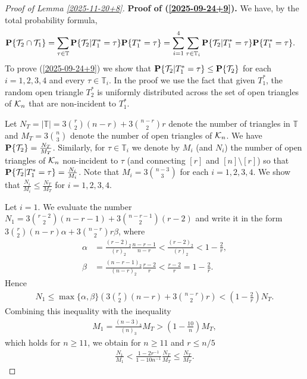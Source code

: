 \documentclass[11pt, a4paper]{article}
\newcommand{\PP}{{\bf{P}}}
\begin{document}
\begin{proof}[Proof of Lemma \ref{2025-11-20+8}]
\smallskip
 
{\bf Proof of (\ref{2025-09-24+9}).}
 We have, by the total probability formula,
 \begin{align*}
 \PP\{{\cal T}_2\cap {\cal T}_1\}
 &
 =
 \sum_{\tau\in{\mathbb T}}
 \PP\{{\cal T}_2|T^*_1=\tau\}
  \PP\{T^*_1=\tau\}
  =
\sum_{i=1}^4
\sum_{\tau\in{\mathbb T}_i}
 \PP\{{\cal T}_2|T^*_1=\tau\}
  \PP\{T^*_1=\tau\}.
 \end{align*}
To prove (\ref{2025-09-24+9}) we show that 
$\PP\{{\cal T}_2|T^*_1=\tau\}
 \le \PP\{{\cal T}_2\}$
 for each $i=1,2,3,4$ and every $\tau\in {\mathbb T}_i$. In the proof we use the fact that given 
$T_1^*$, the random open triangle $T_2^*$ is uniformly distributed 
across the set of open triangles of ${\cal K}_n$ that are 
non-incident to $T_1^*$.
 
 Let  
 $N_T=|{\mathbb T}|=3\binom{r}{2}(n-r)+3\binom{n-r}{2}r$ denote
 the number of triangles 
 in $\mathbb T$ and 
$M_T=3\binom{n}{3}$ denote the number of open triangles of ${\cal K}_n$. 
We have $\PP\{{\cal T}_2\}=\frac{N_T}{M_T}$.
Similarly, for $\tau\in{\mathbb T}_i$ we denote
by 
$M_i$ (and $N_i$) the number of open triangles 
 of ${\cal K}_n$ non-incident to 
$\tau$ (and connecting $[r]$ and $[n]\setminus[r]$) so that
$\PP\{{\cal T}_2|T^*_1=\tau\}
=\frac{N_i}{M_i}$.
Note that 
 $M_i=3\binom{n-3}{3}$ for each $i=1,2,3,4$.
 We show that $\frac{N_i}{M_i}\le \frac{N_T}{M_T}$ for $i=1,2,3,4$.  
  
  

Let $i=1$.
We evaluate the number  
$
N_1
=
3\binom{r-2}{2}(n-r-1)+ 3\binom{n-r-1}{2}(r-2)
$ and write it in the form
$
3\binom{r}{2}(n-r)\alpha+3\binom{n-r}{2}r \beta$,
where
\begin{align*}
\alpha
&
=\frac{(r-2)_2}{(r)_2}\frac{n-r-1}{n-r}
<
\frac{(r-2)_2}{(r)_2}
<
1-\frac{2}{r},
\\
\beta
&
=\frac{(n-r-1)_2}{(n-r)_2}\frac{r-2}{r}
<\frac{r-2}{r}
=
1-\frac{2}{r}.
\end{align*}
Hence
\begin{align*}
N_1
\le 
\max\{\alpha,\beta\}
\left(3\binom{r}{2}(n-r)+3\binom{n-r}{2}r \right)
<
\left(1-\frac{2}{r}\right)
N_T.
\end{align*}
Combining this inequality with the inequality
\begin{align}
\label{2025-09-24+5}
M_1
=
\frac{(n-3)_3}{(n)_3}
M_T
>
\left(1-\frac{10}{n}\right)
M_T,
\end{align}
which holds for  $n\ge 11$, we obtain for 
$n\ge 11$ and $r\le n/5$
\begin{align*}
\frac{N_1}{M_1}
< 
\frac{1-2r^{-1}}{1-10n^{-1}}\frac{N_T}{M_T}
\le 
\frac{N_T}{M_T}.
\end{align*}



\end{proof}
\end{document}
